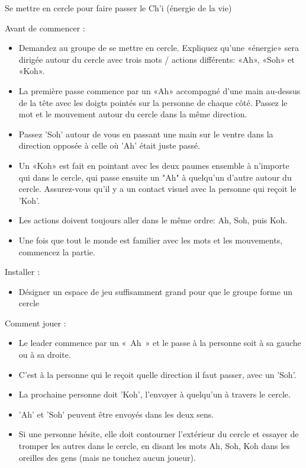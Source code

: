 \documentclass{grand-jeu}
\begin{document}
\begin{regles}
Se mettre en cercle pour faire passer le Ch'i (énergie de la vie)

Avant de commencer :
\begin{itemize}
    \item{Demandez au groupe de se mettre en cercle. Expliquez qu'une «énergie» sera dirigée autour du cercle avec trois mots / actions différents: «Ah», «Soh» et «Koh».}
    \item{La première passe commence par un «Ah» accompagné d'une main au-dessus de la tête avec les doigts pointés sur la personne de chaque côté. Passez le mot et le mouvement autour du cercle dans la même direction.}
    \item{Passez 'Soh' autour de vous en passant une main sur le ventre dans la direction opposée à celle où 'Ah' était juste passé.}
    \item{Un «Koh» est fait en pointant avec les deux paumes ensemble à n'importe qui dans le cercle, qui passe ensuite un "Ah" à quelqu'un d'autre autour du cercle. Assurez-vous qu'il y a un contact visuel avec la personne qui reçoit le 'Koh'.}
    \item{Les actions doivent toujours aller dans le même ordre: Ah, Soh, puis Koh.}
    \item{Une fois que tout le monde est familier avec les mots et les mouvements, commencez la partie.}
\end{itemize}
Installer :
\begin{itemize}
    \item{Désigner un espace de jeu suffisamment grand pour que le groupe forme un cercle}
\end{itemize}
Comment jouer :
\begin{itemize}
    \item{Le leader commence par un « Ah » et le passe à la personne soit à sa gauche ou à sa droite.}
    \item{C'est à la personne qui le reçoit quelle direction il faut passer, avec un 'Soh'.}
    \item{La prochaine personne doit 'Koh', l'envoyer à quelqu'un à travers le cercle.}
    \item{'Ah' et 'Soh' peuvent être envoyés dans les deux sens.}
    \item{Si une personne hésite, elle doit contourner l'extérieur du cercle et essayer de tromper les autres dans le cercle, en disant les mots Ah, Soh, Koh dans les oreilles des gens (mais ne touchez aucun joueur).}
\end{itemize}
\end{regles}

\begin{moments-stop}
\end{moments-stop}
\end{document}
